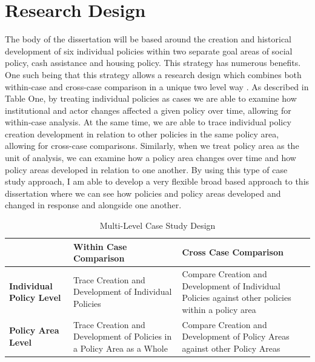 \documentclass[12pt]{article}
\begin{document}
\section{Research Design}
The body of the dissertation will be based around the creation and historical development of six individual policies within two separate goal areas of social policy, cash assistance and housing policy. This strategy has numerous benefits. One such being that this strategy allows a research design which combines both within-case and cross-case comparison in a unique two level way \citep{george2005, goertz2012}. As described in Table One, by treating individual policies as cases we are able to examine how institutional and actor changes affected a given policy over time, allowing for within-case analysis. At the same time, we are able to trace individual policy creation development in relation to other policies in the same policy area, allowing for cross-case comparisons. Similarly, when we treat policy area as the unit of analysis, we can examine how a policy area changes over time and how policy areas developed in relation to one another. By using this type of case study approach, I am able to develop a very flexible broad based approach to this dissertation where we can see how policies and policy areas developed and changed in response and alongside one another. 


\begin{table}
\centering
    \begin{tabularx}{\textwidth}{XXX} \toprule
           & \textbf{Within Case Comparison} & \textbf{Cross Case Comparison                                                                              } \\ \midrule
    \textbf{Individual Policy Level} & Trace Creation and Development of Individual Policies        & Compare Creation and Development of Individual Policies against other policies within a policy area \\
    \textbf{Policy Area Level}       & Trace Creation and Development of Policies in a Policy Area as a Whole & Compare Creation and Development of Policy Areas against other Policy Areas                         \\ \bottomrule
    \end{tabularx}
  \caption{Multi-Level Case Study Design}
  \label{tab:casestudy}
\end{table}
\end{document}
